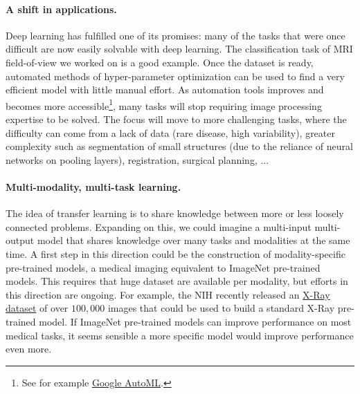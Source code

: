 \paragraph*{A shift in applications.}
Deep learning has fulfilled one of its promises: many of the tasks that were once difficult are now easily solvable with deep learning. The classification task of MRI field-of-view we worked on is a good example. Once the dataset is ready, automated methods of hyper-parameter optimization can be used to find a very efficient model with little manual effort. As automation tools improves and becomes more accessible\footnote{See for example \href{https://cloud.google.com/automl/}{Google AutoML}.}, many tasks will stop requiring image processing expertise to be solved. The focus will move to more challenging tasks, where the difficulty can come from a lack of data (rare disease, high variability), greater complexity such as segmentation of small structures (due to the reliance of neural networks on pooling layers), registration, surgical planning, ...

\paragraph*{Multi-modality, multi-task learning.}
The idea of transfer learning is to share knowledge between more or less loosely connected problems. Expanding on this, we could imagine a multi-input multi-output model that shares knowledge over many tasks and modalities at the same time. A first step in this direction could be the construction of modality-specific pre-trained models, a medical imaging equivalent to ImageNet pre-trained models. This requires that huge dataset are available per modality, but efforts in this direction are ongoing. For example, the NIH recently released an \href{https://nihcc.app.box.com/v/ChestXray-NIHCC}{X-Ray dataset} of over $100,000$ images that could be used to build a standard X-Ray pre-trained model. If ImageNet pre-trained models can improve performance on most medical tasks, it seems sensible a more specific model would improve performance even more.




